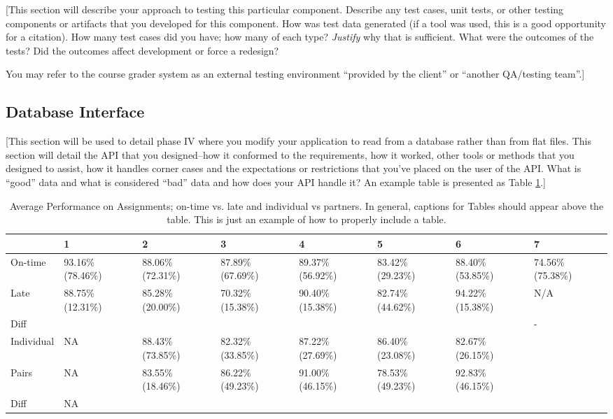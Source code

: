 \documentclass[12pt]{scrartcl} %
\begin{document}
[This section will describe your approach to testing this particular 
component.  Describe any test cases, unit tests, or other testing 
components or artifacts that you developed for this component.  How
was test data generated (if a tool was used, this is a good opportunity
for a citation).  How many test cases did you have; how many of each type?  
\emph{Justify} why that is sufficient.  What were the outcomes of the tests?
Did the outcomes affect development or force a redesign?

You may refer to the course grader system as an external testing 
environment ``provided by the client'' or ``another QA/testing team''.]

\subsection{Database Interface}

[This section will be used to detail phase IV where you modify your 
application to read from a database rather than from flat files.  
This section will detail the API that you designed--how it conformed 
to the requirements, how it worked, other tools or methods that you 
designed to assist, how it handles corner cases and the expectations 
or restrictions that you've placed on the user of the API.  What is
``good'' data and what is considered ``bad'' data and how does your
API handle it?  An example table is presented as Table 
\ref{table:assignmentPerformance}.]

\begin{table}[h] %
\centering
\caption{Average Performance on Assignments; on-time vs. late and individual vs partners.  In general, captions for Tables should appear above the table.
This is just an example of how to properly include a table.}
\label{table:assignmentPerformance}
\begin{tabular}{|l|p{1.5cm}|p{1.5cm}|p{1.5cm}|p{1.5cm}|p{1.5cm}|p{1.5cm}|p{1.5cm}|}
\hline
~ & 1 & 2 & 3 & 4 & 5 & 6 & 7 \\
\hline
On-time	& 93.16\% (78.46\%)	& 88.06\% (72.31\%)	& 87.89\% (67.69\%)	& 89.37\% (56.92\%) & 83.42\% (29.23\%) & 88.40\% (53.85\%) & 74.56\% (75.38\%) \\
\hline
Late & 88.75\% (12.31\%) & 85.28\% (20.00\%) & 70.32\% (15.38\%) & 90.40\% (15.38\%) & 82.74\% (44.62\%) & 94.22\% (15.38\%) & N/A \\
\hline
Diff & \color{red}{4.42\%} & \color{red}{2.79\%} & \color{red}{17.57\%} & \color{green}{1.03\%} & \color{red}{0.68\%} & \color{green}{5.82\%} & - \\
\hline
Individual & NA	& 88.43\% (73.85\%) & 82.32\% (33.85\%) & 87.22\% (27.69\%) & 86.40\% (23.08\%) & 82.67\% (26.15\%) & ~\\
\hline
Pairs & NA & 83.55\% (18.46\%) & 86.22\% (49.23\%) & 91.00\% (46.15\%) & 78.53\% (49.23\%) & 92.83\% (46.15\%) & ~\\
\hline
Diff & NA & \color{red}{4.88\%} & \color{green}{3.90\%} & \color{green}{3.78\%} & \color{red}{7.87\%} & \color{green}{10.16\%}	& ~\\
\hline
\end{tabular}
\end{table}
\end{document}
